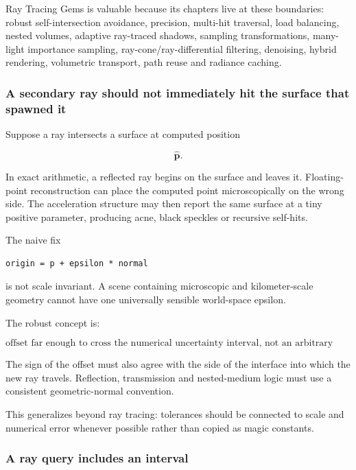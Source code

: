 Ray Tracing Gems is valuable because its chapters live at these boundaries: robust self-intersection avoidance, precision, multi-hit traversal, load balancing, nested volumes, adaptive ray-traced shadows, sampling transformations, many-light importance sampling, ray-cone/ray-differential filtering, denoising, hybrid rendering, volumetric transport, path reuse and radiance caching.

\subsubsection{A secondary ray should not immediately hit the surface that spawned it}\label{03-visual-computing-i-ch001-a-secondary-ray-should-not-immediately-hit-the-surface-that-spawned-it}

Suppose a ray intersects a surface at computed position

\[
\widehat{\mathbf p}.
\]

In exact arithmetic, a reflected ray begins on the surface and leaves it. Floating-point reconstruction can place the computed point microscopically on the wrong side. The acceleration structure may then report the same surface at a tiny positive parameter, producing acne, black speckles or recursive self-hits.

The naive fix

\begin{verbatim}
origin = p + epsilon * normal
\end{verbatim}

is not scale invariant. A scene containing microscopic and kilometer-scale geometry cannot have one universally sensible world-space epsilon.

The robust concept is:

\[
\boxed{
\text{offset far enough to cross the numerical uncertainty interval,
not an arbitrary visual distance}
}
\]

The sign of the offset must also agree with the side of the interface into which the new ray travels. Reflection, transmission and nested-medium logic must use a consistent geometric-normal convention.

This generalizes beyond ray tracing: tolerances should be connected to scale and numerical error whenever possible rather than copied as magic constants.

\subsubsection{A ray query includes an interval}\label{03-visual-computing-i-ch001-a-ray-query-includes-an-interval}

